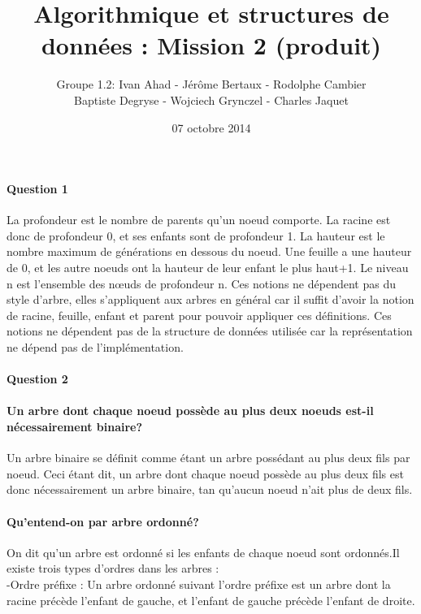 \documentclass[a4paper]{article}
\title{Algorithmique et structures de données : Mission 2 (produit)}
\date{07 octobre 2014}
\author{Groupe 1.2: Ivan Ahad - Jérôme Bertaux - Rodolphe Cambier \\ 
	Baptiste Degryse - Wojciech Grynczel - Charles Jaquet}
\begin{document}
\maketitle
\paragraph{Question 1}
La profondeur est le nombre de parents qu’un noeud comporte. La racine est donc de profondeur 0, et ses enfants sont de profondeur 1. La hauteur est le nombre maximum de générations en dessous du noeud. Une feuille a une hauteur de 0, et les autre noeuds ont la hauteur de leur enfant le plus haut+1. Le niveau n est l’ensemble des nœuds de profondeur n. Ces notions ne dépendent pas du style d’arbre, elles s'appliquent aux arbres en général car il suffit d’avoir la notion de racine, feuille, enfant et parent pour pouvoir appliquer ces définitions. Ces notions ne dépendent pas de la structure de données utilisée car la représentation ne dépend pas de l’implémentation.


\paragraph{Question 2}

\paragraph*{Un arbre dont chaque noeud possède au plus deux noeuds est-il nécessairement binaire?}

Un arbre binaire se définit comme étant un arbre possédant au plus deux fils par noeud. Ceci étant dit, un arbre dont chaque noeud possède au plus deux fils est donc nécessairement un arbre binaire, tan qu'aucun noeud n'ait plus de deux fils.  \\

\paragraph{Qu’entend-on par arbre ordonné?}

On dit qu'un arbre est ordonné si les enfants de chaque noeud sont ordonnés.Il existe trois types d'ordres dans les arbres : \\

-Ordre préfixe : Un arbre ordonné suivant l'ordre préfixe est un arbre dont la racine précède l'enfant de gauche, et l'enfant de gauche précède l'enfant de droite.  \\
\end{document}
